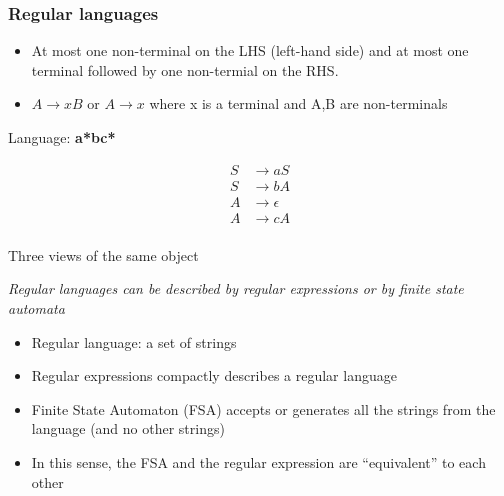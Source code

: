 \documentclass{beamer}
\def\dx{1cm} \def\dy{1.5cm}
\newcommand{\newState}[4]{\node[state,#3](#1)[#4]{#2};}
\newcommand{\newTransition}[4]{\path[->] (#1) edge [#4] node {#3} (#2);}
\begin{document}
\begin{frame}
\frametitle{Regular languages}
\begin{itemize}
\item At most one non-terminal on the LHS (left-hand side) and at most one terminal followed by one non-termial on the RHS.
\item $A \rightarrow xB$ or $ A \rightarrow x $ where x is a terminal and A,B are non-terminals
\end{itemize}

Language: {\bf a*bc*}

\hspace{3cm}

  \begin{align*}
    S & \rightarrow aS \\
    S & \rightarrow bA \\
    A & \rightarrow \epsilon \\
    A & \rightarrow cA \\
  \end{align*}
\end{frame}

\begin{frame}{Three views of the same object}

  {\it Regular languages can be described by regular expressions or by finite state automata}

  \begin{itemize}
  \item Regular language: a set of strings
  \item Regular expressions compactly describes a regular language
  \item Finite State Automaton (FSA) accepts or generates all the strings from the language (and no other strings)
  \item In this sense, the FSA and the regular expression are ``equivalent'' to each other
  \end{itemize}
\end{frame}
\end{document}
